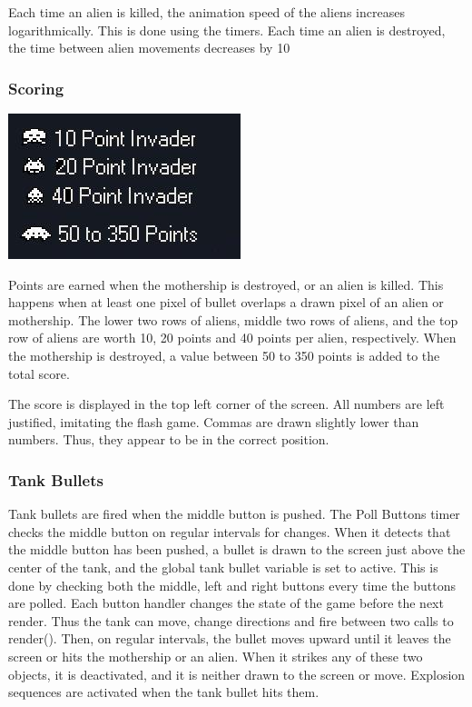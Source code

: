 \documentclass[11pt,letter,oneside]{report}
\begin{document}
Each time an alien is killed, the animation speed of the aliens increases logarithmically. This is done using the timers. Each time an alien is destroyed, the time between alien movements decreases by 10%

\subsubsection{Scoring}
\includegraphics[]{scoring.jpg}

Points are earned when the mothership is destroyed, or an alien is killed. This happens when at least one pixel of bullet overlaps a drawn pixel of an alien or mothership. The lower two rows of aliens, middle two rows of aliens, and the top row of aliens are worth 10, 20 points and 40 points per alien, respectively. When the mothership is destroyed, a value between 50 to 350 points is added to the total score.

The score is displayed in the top left corner of the screen. All numbers are left justified, imitating the flash game. Commas are drawn slightly lower than numbers. Thus, they appear to be in the correct position.


\subsubsection{Tank Bullets}
Tank bullets are fired when the middle button is pushed. The Poll Buttons timer checks the middle button on regular intervals for changes. When it detects that the middle button has been pushed, a bullet is drawn to the screen just above the center of the tank, and the global tank bullet variable is set to active. This is done by checking both the middle, left and right buttons every time the buttons are polled. Each button handler changes the state of the game before the next render. Thus the tank can move, change directions and fire between two calls to render(). Then, on regular intervals, the bullet moves upward until it leaves the screen or hits the mothership or an alien. When it strikes any of these two objects, it is deactivated, and it is neither drawn to the screen or move. Explosion sequences are activated when the tank bullet hits them.
\end{document}
